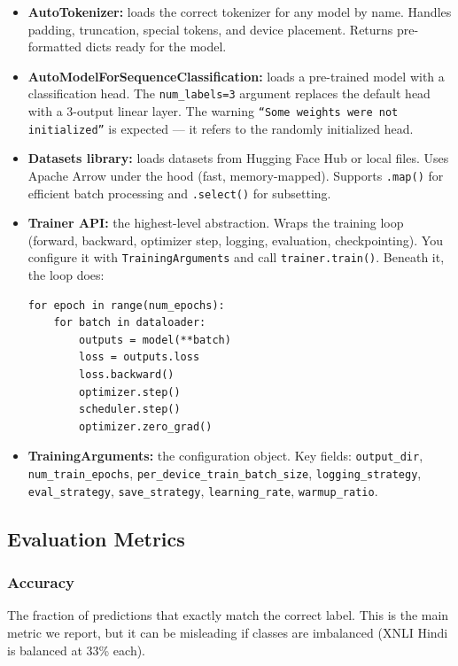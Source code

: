 \begin{itemize}[nosep]
    \item \textbf{AutoTokenizer:} loads the correct tokenizer for any model by name. Handles padding, truncation, special tokens, and device placement. Returns pre-formatted dicts ready for the model.
    \item \textbf{AutoModelForSequenceClassification:} loads a pre-trained model with a classification head. The \texttt{num\_labels=3} argument replaces the default head with a 3-output linear layer. The warning \texttt{``Some weights were not initialized''} is expected --- it refers to the randomly initialized head.
    \item \textbf{Datasets library:} loads datasets from Hugging Face Hub or local files. Uses Apache Arrow under the hood (fast, memory-mapped). Supports \texttt{.map()} for efficient batch processing and \texttt{.select()} for subsetting.
    \item \textbf{Trainer API:} the highest-level abstraction. Wraps the training loop (forward, backward, optimizer step, logging, evaluation, checkpointing). You configure it with \texttt{TrainingArguments} and call \texttt{trainer.train()}. Beneath it, the loop does:
\begin{verbatim}
for epoch in range(num_epochs):
    for batch in dataloader:
        outputs = model(**batch)
        loss = outputs.loss
        loss.backward()
        optimizer.step()
        scheduler.step()
        optimizer.zero_grad()
\end{verbatim}
    \item \textbf{TrainingArguments:} the configuration object. Key fields: \texttt{output\_dir}, \texttt{num\_train\_epochs}, \texttt{per\_device\_train\_batch\_size}, \texttt{logging\_strategy}, \texttt{eval\_strategy}, \texttt{save\_strategy}, \texttt{learning\_rate}, \texttt{warmup\_ratio}.
\end{itemize}

\subsection{Evaluation Metrics}

\subsubsection{Accuracy}

The fraction of predictions that exactly match the correct label. This is the main metric we report, but it can be misleading if classes are imbalanced (XNLI Hindi is balanced at 33\% each).

